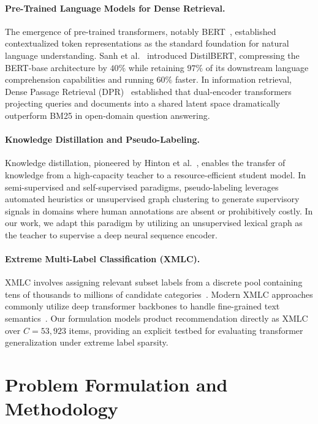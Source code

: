 \documentclass[11pt]{article}
\begin{document}
\paragraph{Pre-Trained Language Models for Dense Retrieval.}
The emergence of pre-trained transformers, notably BERT~\cite{bert}, established contextualized token representations as the standard foundation for natural language understanding. Sanh et al.~\cite{distilbert} introduced DistilBERT, compressing the BERT-base architecture by $40\%$ while retaining $97\%$ of its downstream language comprehension capabilities and running $60\%$ faster. In information retrieval, Dense Passage Retrieval (DPR)~\cite{dpr} established that dual-encoder transformers projecting queries and documents into a shared latent space dramatically outperform BM25 in open-domain question answering.

\paragraph{Knowledge Distillation and Pseudo-Labeling.}
Knowledge distillation, pioneered by Hinton et al.~\cite{hinton2015}, enables the transfer of knowledge from a high-capacity teacher to a resource-efficient student model. In semi-supervised and self-supervised paradigms, pseudo-labeling leverages automated heuristics or unsupervised graph clustering to generate supervisory signals in domains where human annotations are absent or prohibitively costly. In our work, we adapt this paradigm by utilizing an unsupervised lexical graph as the teacher to supervise a deep neural sequence encoder.

\paragraph{Extreme Multi-Label Classification (XMLC).}
XMLC involves assigning relevant subset labels from a discrete pool containing tens of thousands to millions of candidate categories~\cite{xmlc}. Modern XMLC approaches commonly utilize deep transformer backbones to handle fine-grained text semantics~\cite{attentionxml}. Our formulation models product recommendation directly as XMLC over $C = 53{,}923$ items, providing an explicit testbed for evaluating transformer generalization under extreme label sparsity.

\section{Problem Formulation and Methodology}\label{sec:theory}
\end{document}
